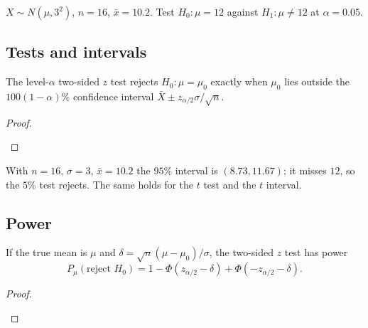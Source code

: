 \begin{example}
$X\sim N(\mu,3^2)$, $n=16$, $\bar x=10.2$. Test $H_0:\mu=12$ against $H_1:\mu\ne12$ at $\alpha=0.05$.
\begin{deriv}
\end{deriv}
\end{example}

\subsection*{Tests and intervals}

\begin{result}
The level-$\alpha$ two-sided $z$ test rejects $H_0:\mu=\mu_0$ exactly when $\mu_0$ lies outside the $100(1-\alpha)\%$ confidence interval $\bar X\pm z_{\alpha/2}\sigma/\sqrt n$.
\end{result}
\begin{proof}
\begin{deriv}
\end{deriv}
\end{proof}

With $n=16$, $\sigma=3$, $\bar x=10.2$ the $95\%$ interval is $(8.73,11.67)$; it misses $12$, so the $5\%$ test rejects. The same holds for the $t$ test and the $t$ interval.

\subsection*{Power}

\begin{result}
If the true mean is $\mu$ and $\delta=\sqrt n(\mu-\mu_0)/\sigma$, the two-sided $z$ test has power
\[
  \boxed{\;P_\mu(\text{reject }H_0)=1-\Phi(z_{\alpha/2}-\delta)+\Phi(-z_{\alpha/2}-\delta).\;}
\]
\end{result}
\begin{proof}
\begin{deriv}
\end{deriv}
\end{proof}

